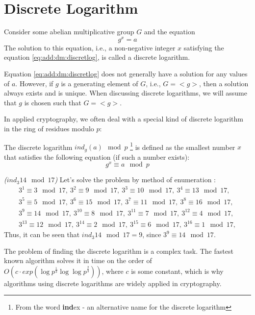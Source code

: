 \section{Discrete Logarithm}
\label{AddDiscretLog}

\begin{definition}
Consider some abelian multiplicative group $G$ and the equation 
\begin{equation}
g^x = a
\label{eq:add:dm:discretlog}
\end{equation}
The solution to this equation, i.e., a non-negative integer $x$
satisfying the equation \eqref{eq:add:dm:discretlog}, is called
a discrete logarithm.
\end{definition}

Equation \eqref{eq:add:dm:discretlog} does not generally have a solution for any values of $a$. However, if $g$ is a generating element of $G$, i.e., $G=<g>$, then a solution always exists and is unique. When discussing discrete logarithms, we will assume that $g$ is chosen such that $G=<g>$.

In applied cryptography, we often deal with a special kind of
discrete logarithm in the ring of residues modulo $p$:
\begin{definition}
The discrete logarithm $ind_g\left(a\right) \mod{p}$
\footnote{From the word {\bf ind}ex - an alternative name for the discrete logarithm}
is defined as the
smallest number $x$ that satisfies the following equation
(if such a number exists): 
\begin{equation}
g^x \equiv a \mod{p}
\end{equation}
\end{definition}

\begin{example}
\emph{($ind_3{14} \mod{17}$)}
Let's solve the problem by method of enumeration \cite{bWikiDiscretLog}:
\begin{eqnarray}
3^1 \equiv 3 \mod{17},\: 
3^2 \equiv 9 \mod{17},\: 
3^3 \equiv 10 \mod{17},\:
3^4 \equiv 13 \mod{17}, 
\nonumber \\
3^5 \equiv 5 \mod{17},\: 
3^6 \equiv 15 \mod{17},\: 
3^7 \equiv 11 \mod{17},\: 
3^8 \equiv 16 \mod{17}, 
\nonumber \\
3^9 \equiv 14 \mod{17},\: 
3^{10} \equiv 8 \mod{17},\: 
3^{11} \equiv 7 \mod{17},\: 
3^{12} \equiv 4 \mod{17}, 
\nonumber \\
3^{13} \equiv 12 \mod{17},\: 
3^{14} \equiv 2 \mod{17},\:
3^{15} \equiv 6 \mod{17},\: 
3^{16} \equiv 1 \mod{17},
\nonumber
\end{eqnarray}
Thus, it can be seen that $ind_3{14} \mod{17} = 9$, 
since $3^9 \equiv 14 \mod{17}$. 
\label{ex:dm:discretlog}
\end{example}

The problem of finding the discrete logarithm is a complex
task. The fastest known algorithm
\cite{bGordon93discretelogarithms} solves it in time on the order of 
\(
O\left(c \cdot
exp\left(\log{p}^{\frac{1}{3}}\log{\log{p}}^{\frac{2}{3}}
\right)\right)
\), where $c$ is some constant,
which is why algorithms using
discrete logarithms are widely applied in cryptography.